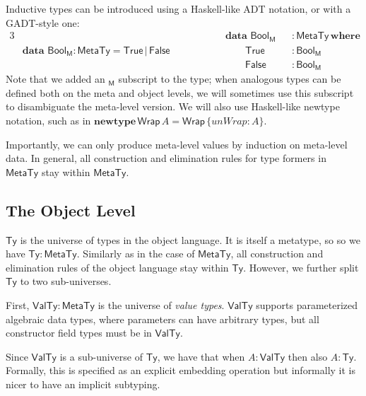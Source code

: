 \documentclass[acmsmall,screen,review,anonymous]{acmart}
\newcommand{\mit}[1]{\mathit{#1}}
\newcommand{\msf}[1]{\mathsf{#1}}
\newcommand{\mbf}[1]{\mathbf{#1}}
\newcommand{\bs}[1]{\boldsymbol{#1}}
\newcommand{\ind}{\hspace{1em}}
\newcommand{\data}{\mbf{data}\,}
\newcommand{\where}{\mbf{where}}
\newcommand{\M}{\msf{M}}
\newcommand{\Bool}{\msf{Bool}}
\newcommand{\MTy}{\msf{MetaTy}}
\newcommand{\VTy}{\msf{ValTy}}
\newcommand{\Ty}{\msf{Ty}}
\newcommand{\True}{\msf{True}}
\newcommand{\False}{\msf{False}}
\theoremstyle{remark}
\newcommand{\newtype}{\mbf{newtype}\,}
\begin{document}
Inductive types can be introduced using a Haskell-like ADT notation, or with a GADT-style one:
\begin{alignat*}{3}
  &                                           &&\hspace{4em}\data\,\Bool_\M &&: \MTy\,\where\\
  & \data\,\Bool_\M : \MTy = \True\,|\,\False &&\hspace{4em}\ind\ind \True &&: \Bool_\M\\
  &                                           &&\hspace{4em}\ind\ind \False &&: \Bool_\M
\end{alignat*}
Note that we added an $_\M$ subscript to the type; when analogous types can be
defined both on the meta and object levels, we will sometimes use this subscript
to disambiguate the meta-level version. We will also use Haskell-like newtype
notation, such as in $\newtype \msf{Wrap}\,A = \msf{Wrap}\,\{\mit{unWrap} : A
\}$.

Importantly, we can only produce meta-level values by induction on meta-level
data. In general, all construction and elimination rules for type formers in
$\MTy$ stay within $\MTy$.

\subsection{The Object Level}\label{sec:the-object-level}

$\bs{\Ty}$ is the universe of types in the object language. It is itself a
metatype, so so we have $\Ty : \MTy$. Similarly as in the case of $\MTy$, all
construction and elimination rules of the object language stay within $\Ty$.
However, we further split $\Ty$ to two sub-universes.

First, $\bs{\VTy} : \MTy$ is the universe of \emph{value types}. $\VTy$ supports
parameterized algebraic data types, where parameters can have arbitrary types,
but all constructor field types must be in $\VTy$.

Since $\VTy$ is a sub-universe of $\Ty$, we have that when $A : \VTy$ then also
$A : \Ty$. Formally, this is specified as an explicit embedding operation but
informally it is nicer to have an implicit subtyping.
\end{document}
